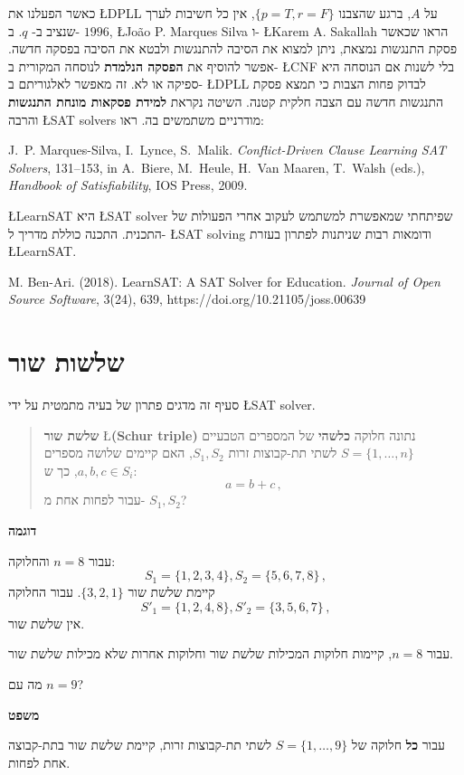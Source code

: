\documentclass[12pt,a4paper]{article}
\begin{document}
כאשר הפעלנו את
\L{DPLL}
על
$A$,
ברגע שהצבנו
$\{p=T,r=F\}$,
אין כל חשיבות לערך שנציב ב-%
$q$.
ב-%
$1996$,
\L{Jo\~{a}o P. Marques Silva}
ו-%
\L{Karem A. Sakallah}
הראו שכאשר פסקת התנגשות נמצאת, ניתן למצוא את הסיבה להתנגשות ולבטא את הסיבה בפסקה חדשה. אפשר להוסיף את
\textbf{הפסקה הנלמדת}
לנוסחה המקורית ב-%
\L{CNF}
בלי לשנות אם הנוסחה היא ספיקה או לא. זה מאפשר לאלגוריתם ב-%
\L{DPLL}
לבדוק פחות הצבות כי תמצא פסקת התנגשות חדשה עם הצבה חלקית קטנה. השיטה נקראת
\textbf{למידת פסקאות מונחת התנגשות}
והרבה 
\L{SAT solvers}
מודרניים משתמשים בה. ראו:

J.~P. Marques-Silva, I.~Lynce, S.~Malik. {\em Conflict-Driven Clause Learning SAT Solvers}, 131--153, in A.~Biere, M.~Heule, H.~Van Maaren, T.~Walsh (eds.), {\em Handbook of Satisfiability}, IOS Press, 2009.

\L{LearnSAT}
היא
\L{SAT solver}
שפיתחתי שמאפשרת למשתמש לעקוב אחרי הפעולות של התכנית. התכנה כוללת מדריך ל-%
\L{SAT solving}
ודומאות רבות שניתנות לפתרון בעזרת
\L{LearnSAT}.

M. Ben-Ari. (2018). LearnSAT: A SAT Solver for Education. \textit{Journal of Open Source Software}, 3(24), 639, https://doi.org/10.21105/joss.00639

\section{שלשות שור}

סעיף זה מדגים פתרון של בעיה מתמטית על ידי
\L{SAT solver}.

\begin{quote}
\textbf{שלשת שור} \L{\textbf{(Schur triple)}}
נתונה חלוקה
\textbf{כלשהי}
של המספרים הטבעיים
$S=\{1,\ldots,n\}$
לשתי תת-קבוצות זרות
$S_1,S_2$,
האם קיימים שלושה מספרים
$a,b,c\in S_i$,
כך ש:
\[
a=b+c\,,
\]
עבור לפחות אחת מ-%
$S_1,S_2$?
\end{quote}

\textbf{דוגמה}

עבור
$n=8$
והחלוקה:
\[
S_1 = \{1,2,3,4\}, S_2 = \{5,6,7,8\}\,,
\]
קיימת שלשת שור
$\{3,2,1\}$.
עבור החלוקה
\[
S'_1 = \{1,2,4,8\}, S'_2 = \{3,5,6,7\}\,,
\]
אין שלשת שור.

עבור
$n=8$,
קיימות חלוקות המכילות שלשת שור וחלוקות אחרות שלא מכילות שלשת שור.

מה עם
$n=9$?

\textbf{משפט}

עבור
\textbf{כל}
חלוקה של
$S=\{1,\ldots,9\}$
לשתי תת-קבוצות זרות, קיימת שלשת שור בתת-קבוצה אחת לפחות.
\end{document}
